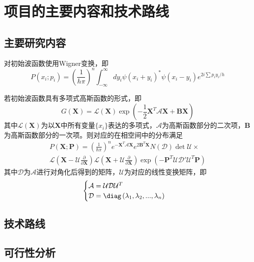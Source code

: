\section{项目的主要内容和技术路线}

\subsection{主要研究内容}
对初始波函数使用Wigner变换，即
\begin{equation}
	P\left(x_{i} ; p_{i}\right)=\left(\frac{1}{h \pi}\right)^{n} \int_{-\infty}^{\infty} d y_{i} \psi\left(x_{i}+y_{i}\right)^{*} \psi\left(x_{i}-y_{i}\right) e^{2 i \sum p_{i} y_{i} / h}
\end{equation}

若初始波函数具有多项式高斯函数的形式，即
\begin{equation}
	G(\boldsymbol{X}) = \mathcal{L}(\boldsymbol{X}) \exp{ \left( - \frac{1}{2} \boldsymbol{X}^T \mathcal{A} \boldsymbol{X} + \boldsymbol{B} \boldsymbol{X}\right)   }	
\end{equation}
其中$\mathcal{L}(\boldsymbol{X})$为以$\boldsymbol{X}$中所有变量$\{x_i\}$表达的多项式，$\mathcal{A}$为高斯函数部分的二次项，$\boldsymbol{B}$为高斯函数部分的一次项。则对应的在相空间中的分布满足
\begin{equation}
	\begin{aligned}
	P(\boldsymbol{X};\boldsymbol{P}) = \left( \frac{1}{\hbar \pi} \right) ^n e^{-\boldsymbol{X}^T \mathcal{A} \boldsymbol{X}} e^{2\boldsymbol{B}^T\boldsymbol{X}} N(\mathcal{D}) \det \mathcal{U}\times \\
\mathcal{L}\left(\boldsymbol{X} - \mathcal{U} \frac{\partial }{\partial \boldsymbol{X}} \right)\mathcal{L}\left(\boldsymbol{X} + \mathcal{U} \frac{\partial }{\partial \boldsymbol{X}} \right)\exp \left( - \boldsymbol{P}^T \mathcal{U} \mathcal{D}' \mathcal{U}^T \boldsymbol{P} \right)  
\end{aligned}
\end{equation} 
其中$\mathcal{D}$为$\mathcal{A}$进行对角化后得到的矩阵，$\mathcal{U}$为对应的线性变换矩阵，即
 \begin{equation}
	 \begin{cases}
	 \mathcal{A} = \mathcal{U} \mathcal{D} \mathcal{U}^T\\
	 \mathcal{D} = \diag\left( \lambda_1, \lambda_2, ..., \lambda_n \right) 
         \end{cases}
\end{equation} 


\subsection{技术路线}

\subsection{可行性分析}
